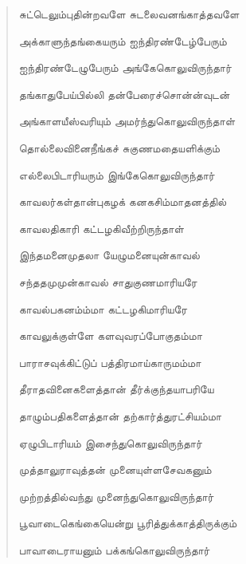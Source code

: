 \documentclass{article}
\begin{document}
\begin{quotation}
{சுட்டெலும்புதின்றவளே சுடலைவனங்காத்தவளே

அக்காளுந்தங்கையரும் ஐந்திரண்டேழ்பேரும்

ஐந்திரண்டேழுபேரும் அங்கேகொலுவிருந்தார்

தங்காதுபேய்பில்லி தன்பேரைச்சொன்ன்வுடன்

அங்காளயீஸ்வரியும் அமர்ந்துகொலுவிருந்தாள்

தொல்லைவினைநீங்கச் சுகுணமதையளிக்கும்

எல்லைபிடாரியரும் இங்கேகொலுவிருந்தார்

காவலர்கள்தான்புகழக் கனகசிம்மாதனத்தில்

காவலதிகாரி கட்டழகிவீற்றிருந்தாள்

இந்தமனைமுதலா யேழுமனையுன்காவல்

சந்ததமுமுன்காவல் சாதுகுணமாரியரே

காவல்பகனம்ம்மா கட்டழகிமாரியரே

காவலுக்குள்ளே களவுவரப்போகுதம்மா

பாராசவுக்கிட்டுப் பத்திரமாய்காருமம்மா

தீராதவினைகளைத்தான் தீர்க்குந்தயாபரியே

தாழும்பதிகளைத்தான் தற்கார்த்துரட்சியம்மா

ஏழுபிடாரியம் இசைந்துகொலுவிருந்தார்

முத்தாலுராவுத்தன் முனையுள்ளசேவகனும்

முற்றத்தில்வந்து முனைந்துகொலுவிருந்தார்

பூவாடைகெங்கையென்று பூரித்துக்காத்திருக்கும்

பாவாடைராயனும் பக்கங்கொலுவிருந்தார்

}
\end{quotation}
\end{document}

